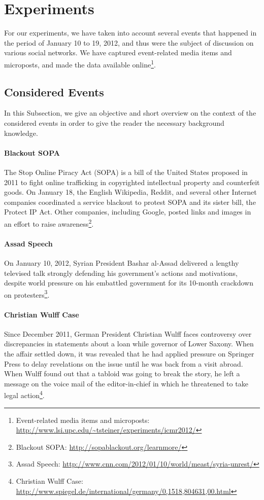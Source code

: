\documentclass{acm_proc_article-sp}
\newcommand{\inlinelistingsize}{\fontsize{8pt}{11pt}}
\let\oldurl\url
\renewcommand{\url}[1]{\inlinelistingsize\oldurl{#1}}
\begin{document}
\section{Experiments}
\label{sec:experiments}
For our experiments, we have taken into account several events that happened in the period of January 10 to 19, 2012, and thus were the subject of discussion on various social networks.
We have captured event-related media items and microposts, and made the data available online\footnote{Event-related media items and microposts: \url{http://www.lsi.upc.edu/~tsteiner/experiments/icmr2012/}}. 

\subsection{Considered Events}
In this Subsection, we give an objective and short overview on the context of the considered events in order to give the reader the necessary background knowledge.

\paragraph{Blackout SOPA}
The Stop Online Piracy Act (SOPA) is a bill of the United States proposed in 2011 to fight online trafficking in copyrighted intellectual property and counterfeit goods.
On January 18, the English Wikipedia, Reddit, and several other Internet companies coordinated a service blackout to protest SOPA and its sister bill, the Protect IP Act.
Other companies, including Google, posted links and images in an effort to raise awareness\footnote{Blackout SOPA: \url{http://sopablackout.org/learnmore/}}.

\paragraph{Assad Speech}
On January 10, 2012, Syrian President Bashar al-Assad delivered a lengthy televised talk strongly defending his government's actions and motivations, despite world pressure on his embattled government for its 10-month crackdown on protesters\footnote{Assad Speech: \url{http://www.cnn.com/2012/01/10/world/meast/syria-unrest/}}. 

\paragraph{Christian Wulff Case}
Since December 2011, German President Christian Wulff faces controversy over discrepancies in statements about a loan while governor of Lower Saxony.
When the affair settled down, it was revealed that he had applied pressure on Springer Press to delay revelations on the issue until he was back from a visit abroad.
When Wulff found out that a tabloid was going to break the story, he left a message on the voice mail of the editor-in-chief in which he threatened to take legal action\footnote{Christian Wulff Case: \url{http://www.spiegel.de/international/germany/0,1518,804631,00.html}}.
\end{document}
